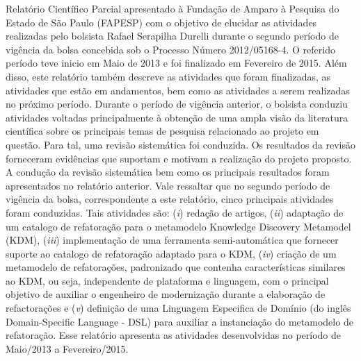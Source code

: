 
 Relatório Científico Parcial apresentado à Fundação de Amparo à Pesquisa do Estado de São Paulo (FAPESP) com o objetivo de elucidar as atividades realizadas  
 pelo bolsista Rafael Serapilha Durelli durante o segundo período de vigência da bolsa concebida sob o Processo Número 2012/05168-4. 
 O referido período teve inicio em Maio de 2013 e foi finalizado em Fevereiro de 2015. 
 Além disso, este relatório também descreve as atividades que foram finalizadas, as atividades que estão em andamentos, bem como as atividades a serem realizadas no próximo período. 
%
Durante o período de vigência anterior, o bolsista conduziu atividades voltadas principalmente à obtenção de uma ampla visão da literatura científica sobre os principais temas de pesquisa relacionado ao projeto em questão. Para tal, uma revisão sistemática foi conduzida. Os resultados da revisão forneceram evidências que suportam e motivam a realização do projeto proposto. A condução da revisão sistemática bem como os principais resultados foram apresentados no relatório anterior.
%
Vale ressaltar que no segundo período de vigência da bolsa, correspondente a este relatório, cinco principais atividades foram conduzidas. Tais atividades são: (\textit{i}) redação de artigos, (\textit{ii}) adaptação de um catalogo de refatoração para o metamodelo Knowledge Discovery Metamodel (KDM), (\textit{iii}) implementação de uma ferramenta semi-automática que fornecer suporte ao catalogo de refatoração adaptado para o KDM, (\textit{iv}) criação de um metamodelo de refatorações, padronizado que contenha características similares ao KDM, ou seja, independente de plataforma e linguagem, com o principal objetivo de auxiliar o engenheiro de modernização durante a elaboração de refactorações e (\textit{v}) definição de uma Linguagem Especifica de Domínio (do inglês Domain-Specific Language - DSL) para auxiliar a instanciação do metamodelo de refatoração. Esse relatório apresenta as atividades desenvolvidas no período de Maio/2013 a Fevereiro/2015.
%